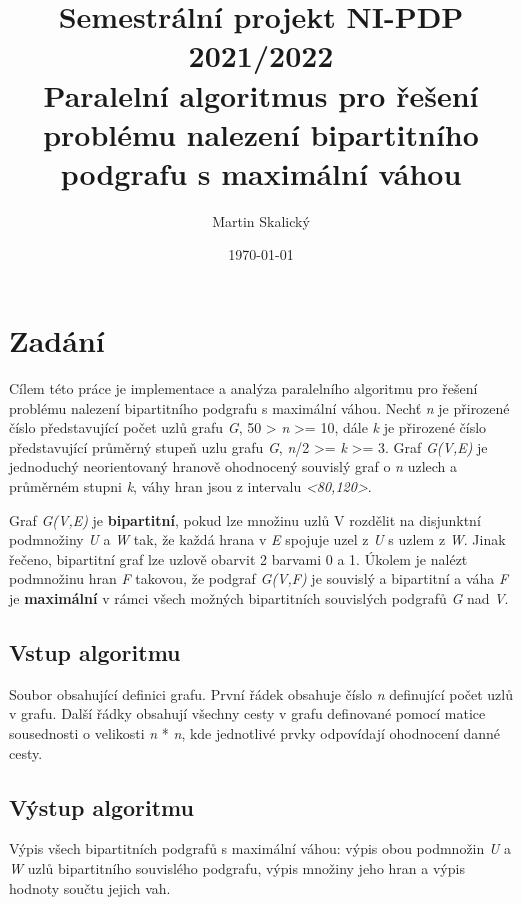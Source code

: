 \documentclass{article}%
\title{%
Semestrální projekt NI-PDP 2021/2022 \\
\large Paralelní algoritmus pro řešení problému nalezení bipartitního podgrafu s maximální váhou}%
\author{Martin Skalický}%
\date{\today}%
\begin{document}
%
\normalsize%
\maketitle%
\section{Zadání}%
\label{sec:Zadn}%
Cílem této práce je implementace a analýza paralelního algoritmu pro řešení problému nalezení bipartitního podgrafu s maximální váhou. Nechť \textit{n} je přirozené číslo představující počet uzlů grafu \textit{G}, 50 > \textit{n} >= 10, dále \textit{k} je přirozené číslo představující průměrný stupeň uzlu grafu \textit{G}, \textit{n}/2 >= \textit{k} >= 3. Graf \textit{G(V,E)} je jednoduchý neorientovaný hranově ohodnocený souvislý graf o \textit{n} uzlech a průměrném stupni \textit{k}, váhy hran jsou z intervalu \textit{<80,120>}.

Graf \textit{G(V,E)} je \textbf{bipartitní}, pokud lze množinu uzlů V rozdělit na disjunktní podmnožiny \textit{U} a \textit{W} tak, že každá hrana v \textit{E} spojuje uzel z \textit{U} s uzlem z \textit{W}. Jinak řečeno, bipartitní graf lze uzlově obarvit 2 barvami 0 a 1. Úkolem je nalézt podmnožinu hran \textit{F} takovou, že podgraf \textit{G(V,F)} je souvislý a bipartitní a váha \textit{F} je \textbf{maximální} v rámci všech možných bipartitních souvislých podgrafů \textit{G} nad \textit{V}.

\subsection{Vstup algoritmu}
Soubor obsahující definici grafu. První řádek obsahuje číslo \textit{n} definující počet uzlů v grafu. Další řádky obsahují všechny cesty v grafu definované pomocí matice sousednosti o velikosti \textit{n} * \textit{n}, kde jednotlivé prvky odpovídají ohodnocení danné cesty.

\subsection{Výstup algoritmu}
Výpis všech bipartitních podgrafů s maximální váhou: výpis obou podmnožin \textit{U} a \textit{W} uzlů bipartitního souvislého podgrafu, výpis množiny jeho hran a výpis hodnoty součtu jejich vah.

%
\end{document}
